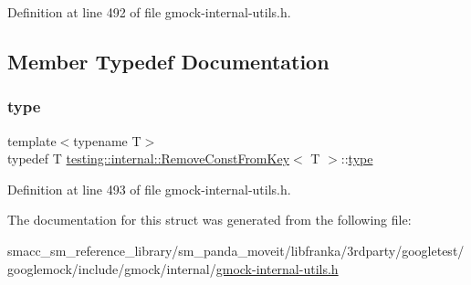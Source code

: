 Definition at line 492 of file gmock-\/internal-\/utils.\+h.



\subsection{Member Typedef Documentation}
\mbox{\label{structtesting_1_1internal_1_1RemoveConstFromKey_ab657b0a0fe4ebc499d27011f73c794c1}} 
\subsubsection{\texorpdfstring{type}{type}}
{\footnotesize\ttfamily template$<$typename T$>$ \\
typedef T \hyperlink{structtesting_1_1internal_1_1RemoveConstFromKey}{testing\+::internal\+::\+Remove\+Const\+From\+Key}$<$ T $>$\+::\hyperlink{structtesting_1_1internal_1_1RemoveConstFromKey_ab657b0a0fe4ebc499d27011f73c794c1}{type}}



Definition at line 493 of file gmock-\/internal-\/utils.\+h.



The documentation for this struct was generated from the following file\+:\begin{DoxyCompactItemize}
\item 
smacc\+\_\+sm\+\_\+reference\+\_\+library/sm\+\_\+panda\+\_\+moveit/libfranka/3rdparty/googletest/googlemock/include/gmock/internal/\hyperlink{gmock-internal-utils_8h}{gmock-\/internal-\/utils.\+h}\end{DoxyCompactItemize}
